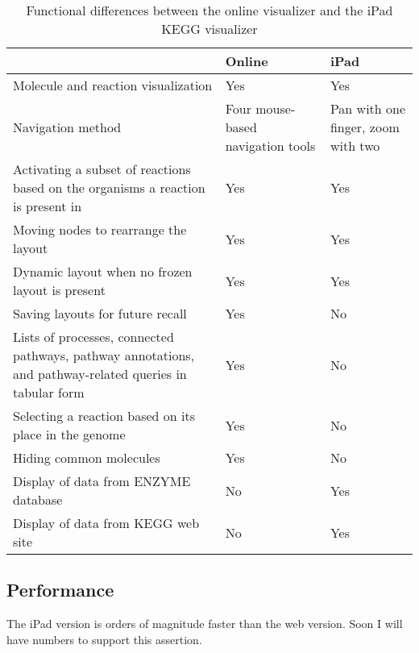 \begin{table}[ht!]
\centering
\begin{tabular}{ | p{2.75in} | p{1.25in} | p{1.25in} | }
    \hline
                        & Online    & iPad \\ \hline

    Molecule and reaction visualization
                        & Yes       & Yes \\ \hline

    Navigation method   & Four mouse-based navigation tools
                                    & Pan with one finger, zoom with two
                                    \\ \hline

    Activating a subset of reactions based on the organisms a reaction is
    present in
                        & Yes       & Yes \\ \hline

    Moving nodes to rearrange the layout
                        & Yes       & Yes \\ \hline

    Dynamic layout when no frozen layout is present
                        & Yes       & Yes \\ \hline

    Saving layouts for future recall
                        & Yes       & No \\ \hline

    Lists of processes, connected pathways, pathway annotations, and
    pathway-related queries in tabular form
                        & Yes       & No \\ \hline

    Selecting a reaction based on its place in the genome
                        & Yes       & No \\ \hline

    Hiding common molecules
                        & Yes       & No \\ \hline

    Display of data from ENZYME database
                        & No        & Yes \\ \hline

    Display of data from KEGG web site
                        & No        & Yes \\ \hline
\end{tabular}
    \label{fig:kegg_comparison_table}
    \caption{Functional differences between the online \pathcasekegg visualizer
    and the iPad KEGG visualizer}
\end{table}

\subsection{Performance}
\label{sect:kegg_comparison_performance}

The iPad version is orders of magnitude faster than the web version. Soon I will
have numbers to support this assertion.
